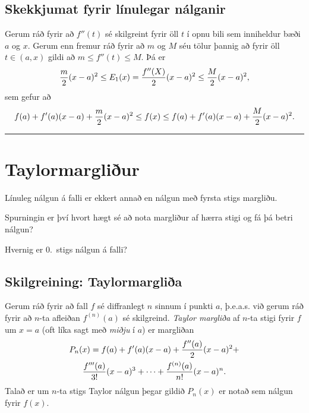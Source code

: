 \documentclass[b5paper,10pt,icelandic]{sphinxmanual}
\begin{document}
\subsection{Skekkjumat fyrir línulegar nálganir}
\label{kafli03:skekkjumat-fyrir-linulegar-nalganir}
Gerum ráð fyrir að \(f''(t)\) sé skilgreint fyrir öll \(t\) í
opnu bili sem inniheldur bæði \(a\) og \(x\). Gerum enn fremur
ráð fyrir að \(m\) og \(M\) séu tölur þannig að fyrir öll
\(t\in (a, x)\) gildi að \(m\leq f''(t)\leq M\). Þá er
\begin{gather}
\begin{split}\frac{m}{2}(x-a)^2\leq E_1(x)
=\frac{f''(X)}{2}(x-a)^2\leq \frac{M}{2}(x-a)^2,\end{split}\notag
\end{gather}
sem gefur að
\begin{gather}
\begin{split}f(a)+f'(a)(x-a)+\frac{m}{2}(x-a)^2\leq f(x)
\leq f(a)+f'(a)(x-a)+\frac{M}{2}(x-a)^2.\end{split}\notag
\end{gather}

\bigskip\hrule{}\bigskip



\section{Taylormargliður}
\label{kafli03:taylormargliur}
Línuleg nálgun á falli er ekkert annað en nálgun með fyrsta stigs
margliðu.

Spurningin er því hvort hægt sé að nota margliður af hærra stigi og fá
þá betri nálgun?

Hvernig er 0. stigs nálgun á falli?


\subsection{Skilgreining: Taylormargliða}
\label{kafli03:skilgreining-taylormarglia}\label{kafli03:index-13}
Gerum ráð fyrir að fall \(f\) sé diffranlegt \(n\) sinnum í
punkti \(a\), þ.e.a.s. við gerum ráð fyrir að \(n\)-ta afleiðan
\(f^{(n)}(a)\) sé skilgreind. \emph{Taylor margliða} af \(n\)-ta
stigi fyrir \(f\) um \(x=a\) (oft líka sagt með \emph{miðju} í
\(a\)) er margliðan
\begin{gather}
\begin{split}\begin{gathered}
    P_n(x)=f(a)+f'(a)(x-a)+\frac{f''(a)}{2}(x-a)^2+ \\
    \frac{f'''(a)}{3!}(x-a)^3+\cdots+\frac{f^{(n)}(a)}{n!}(x-a)^n.\end{gathered}\end{split}\notag
\end{gather}
Talað er um \(n\)-ta stigs Taylor nálgun þegar gildið \(P_n(x)\)
er notað sem nálgun fyrir \(f(x)\).
\end{document}
